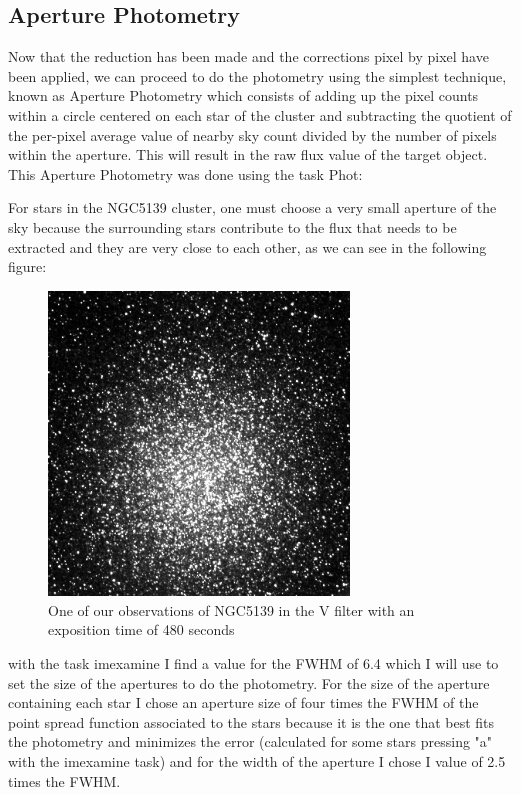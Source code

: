 \subsection{Aperture Photometry}

Now that the reduction has been made and the corrections pixel by pixel have been applied, we can proceed to do the photometry using the simplest technique, known as Aperture Photometry which consists of adding up the pixel counts within a circle centered on each star of the cluster and subtracting the quotient of the per-pixel average value of nearby sky count divided by the number of pixels within the aperture. This will result in the raw flux value of the target object. This Aperture Photometry was done using the task Phot:

For stars in the NGC5139 cluster, one must choose a very small aperture of the sky because the surrounding stars contribute to the flux that needs to be extracted and they are very close to each other, as we can see in the following figure: 

\begin{figure}[h]
\centering
\includegraphics[width=8cm]{images/NGC5139_red.png}
\caption{One of our observations of NGC5139 in the V filter with an exposition time of 480 seconds}
\end{figure}

with the task imexamine I find a value for the FWHM of 6.4 which I will use to set the size of the apertures to do the photometry. For the size of the aperture containing each star I chose an aperture size of four times the FWHM of the point spread function associated to the stars because it is the one that best fits the photometry and minimizes the error (calculated for some stars pressing "a" with the imexamine task) and for the width of the aperture I chose I value of 2.5 times the FWHM.

